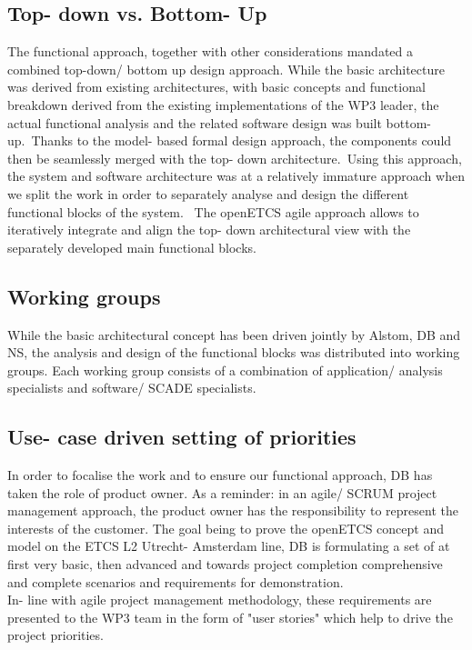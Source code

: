 \subsection{Top- down vs. Bottom- Up}
%
%
The functional approach, together with other considerations mandated a combined top-down/ bottom up design approach.
While the basic architecture was derived from existing architectures, with basic concepts and functional breakdown derived from the existing implementations of the WP3 leader, the actual functional analysis and the related software design was built bottom- up.\
Thanks to the model- based formal design approach, the components could then be seamlessly merged with the top- down architecture.\
Using this approach, the system and software architecture was at a relatively immature approach when we split the work in order to separately analyse and design the different functional blocks of the system. \
The openETCS agile approach allows to iteratively integrate and align the top- down architectural view with the separately developed main functional blocks.\


\subsection{Working groups}
%
%
While the basic architectural concept has been driven jointly by Alstom, DB and NS, the analysis and design of the functional blocks was distributed into working groups.
Each working group consists of a combination of application/ analysis specialists and software/ SCADE specialists.\\

\subsection{Use- case driven setting of priorities}
%
%
In order to focalise the work and to ensure our functional approach, DB has taken the role of product owner. 
As a reminder: in an agile/ SCRUM project management approach, the product owner has the responsibility to represent the interests of the customer.
The goal being to prove the openETCS concept and model on the ETCS L2 Utrecht- Amsterdam line, DB is formulating a set of at first very basic, then advanced and towards project completion comprehensive and complete scenarios and requirements for demonstration. \\
In- line with agile project management methodology, these requirements are presented to the WP3 team in the form of "user stories" which help to drive the project priorities. \\

